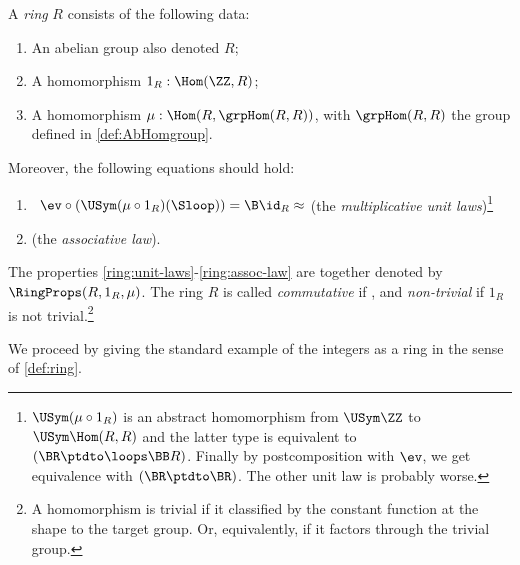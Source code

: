 \begin{definition}\label{def:ring}
A \emph{ring} $R$ consists of the following data:
\begin{enumerate}
\item An abelian group also denoted $R$;
\item A homomorphism $1_R:\Hom(\ZZ,R)$;
\item A homomorphism $\mu: \Hom(R,\grpHom(R,R))$, with $\grpHom(R,R)$
the group defined in \cref{def:AbHomgroup}.
\end{enumerate}
Moreover, the following equations should hold:
    \begin{enumerate}
    \item\label{ring:unit-laws}\
    $\ev\circ(\USym(\mu\circ{1_R})(\Sloop)) = \B\id_R \approx \MB{TBD}$ 
    (the \emph{multiplicative unit laws})\footnote{%
 $\USym(\mu\circ{1_R})$ is an abstract homomorphism
from $\USym\ZZ$ to $\USym\Hom(R,R)$ and the latter type
is equivalent to $(\BR\ptdto\loops\BB R)$. Finally by postcomposition
with $\ev$, we get equivalence with $(\BR\ptdto\BR)$.
The other unit law is probably worse.}
    \item\label{ring:assoc-law}  (the \emph{associative law}). %
    \end{enumerate}
The properties \ref{ring:unit-laws}-\ref{ring:assoc-law} 
are together denoted by $\RingProps(R,1_R,\mu)$.
The ring $R$ is called \emph{commutative} if , 
and \emph{non-trivial} if $1_R$ is not trivial.\footnote{%
A homomorphism is trivial if it classified by the constant function
at the shape to the target group. Or, equivalently, if it factors
through the trivial group.}
\end{definition}

We proceed by giving the standard example of the integers as a ring
in the sense of \cref{def:ring}.


